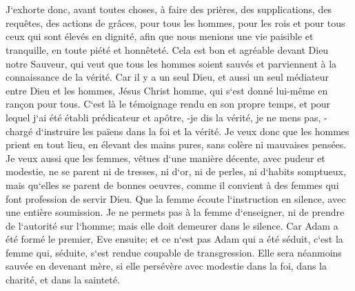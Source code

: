 \chapter{}

\verse J`exhorte donc, avant toutes choses, à faire des prières, des supplications, des requêtes, des actions de grâces, pour tous les hommes, 
\verse pour les rois et pour tous ceux qui sont élevés en dignité, afin que nous menions une vie paisible et tranquille, en toute piété et honnêteté. 
\verse Cela est bon et agréable devant Dieu notre Sauveur, 
\verse qui veut que tous les hommes soient sauvés et parviennent à la connaissance de la vérité. 
\verse Car il y a un seul Dieu, et aussi un seul médiateur entre Dieu et les hommes, Jésus Christ homme, 
\verse qui s`est donné lui-même en rançon pour tous. C`est là le témoignage rendu en son propre temps, 
\verse et pour lequel j`ai été établi prédicateur et apôtre, -je dis la vérité, je ne mens pas, -chargé d`instruire les païens dans la foi et la vérité. 
\verse Je veux donc que les hommes prient en tout lieu, en élevant des mains pures, sans colère ni mauvaises pensées. 
\verse Je veux aussi que les femmes, vêtues d`une manière décente, avec pudeur et modestie, ne se parent ni de tresses, ni d`or, ni de perles, ni d`habits somptueux, 
\verse mais qu`elles se parent de bonnes oeuvres, comme il convient à des femmes qui font profession de servir Dieu. 
\verse Que la femme écoute l`instruction en silence, avec une entière soumission. 
\verse Je ne permets pas à la femme d`enseigner, ni de prendre de l`autorité sur l`homme; mais elle doit demeurer dans le silence. 
\verse Car Adam a été formé le premier, Eve ensuite; 
\verse et ce n`est pas Adam qui a été séduit, c`est la femme qui, séduite, s`est rendue coupable de transgression. 
\verse Elle sera néanmoins sauvée en devenant mère, si elle persévère avec modestie dans la foi, dans la charité, et dans la sainteté. 

\chapter{}

